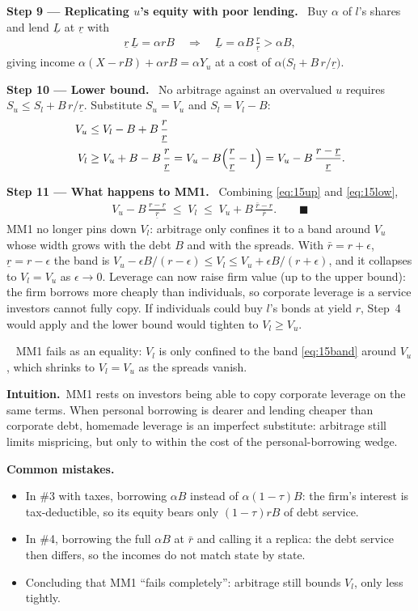 \documentclass[11pt,a4paper]{article}
\numberwithin{equation}{section}
\newcommand{\step}[2]{\par\smallskip\noindent\textbf{Step #1 --- #2.}~}
\newcommand{\intuition}{\par\smallskip\noindent\textbf{Intuition.}~}
\newcommand{\answer}[1]{\par\smallskip\noindent\fbox{\textbf{Answer #1.}}~}
\newcommand{\pitfalls}{\par\medskip\noindent\textbf{Common mistakes.}}
\begin{document}
\step{9}{Replicating $u$'s equity with poor lending} Buy $\alpha$ of $l$'s shares and lend $\underline L$ at $\underline r$ with
\begin{align}
  \underline r\,\underline L = \alpha rB \quad\Longrightarrow\quad \underline L = \alpha B\,\frac{r}{\underline r}>\alpha B, \label{eq:15Llow}
\end{align}
giving income $\alpha(X-rB)+\alpha rB=\alpha Y_u$ at a cost of $\alpha\bigl(S_l+B\,r/\underline r\bigr)$.

\step{10}{Lower bound} No arbitrage against an overvalued $u$ requires $S_u\le S_l+B\,r/\underline r$.
Substitute $S_u=V_u$ and $S_l=V_l-B$:
\begin{align}
  V_u &\le V_l-B+B\,\frac{r}{\underline r} \nonumber\\
  V_l &\ge V_u+B-B\,\frac{r}{\underline r} = V_u - B\Bigl(\frac{r}{\underline r}-1\Bigr) = V_u - B\,\frac{r-\underline r}{\underline r}. \label{eq:15low}
\end{align}

\step{11}{What happens to MM1} Combining \eqref{eq:15up} and \eqref{eq:15low},
\begin{align}
  V_u - B\,\frac{r-\underline r}{\underline r} \;\le\; V_l \;\le\; V_u + B\,\frac{\bar r-r}{\bar r}. \qquad\blacksquare \label{eq:15band}
\end{align}
MM1 no longer pins down $V_l$: arbitrage only confines it to a band around $V_u$ whose width grows
with the debt $B$ and with the spreads. With $\bar r=r+\epsilon$, $\underline r=r-\epsilon$ the band is
$V_u-\epsilon B/(r-\epsilon)\le V_l\le V_u+\epsilon B/(r+\epsilon)$, and it collapses to $V_l=V_u$
as $\epsilon\to0$. Leverage can now raise firm value (up to the upper bound): the firm borrows
more cheaply than individuals, so corporate leverage is a service investors cannot fully copy.
If individuals could buy $l$'s bonds at yield $r$, Step~4 would apply and the lower bound would
tighten to $V_l\ge V_u$.
\answer{(\#4)} MM1 fails as an equality: $V_l$ is only confined to the band \eqref{eq:15band}
around $V_u$, which shrinks to $V_l=V_u$ as the spreads vanish.

\intuition MM1 rests on investors being able to copy corporate leverage on the same terms. When
personal borrowing is dearer and lending cheaper than corporate debt, homemade leverage is an
imperfect substitute: arbitrage still limits mispricing, but only to within the cost of the
personal-borrowing wedge.

\pitfalls
\begin{itemize}
  \item In \#3 with taxes, borrowing $\alpha B$ instead of $\alpha(1-\tau)B$: the firm's interest is
        tax-deductible, so its equity bears only $(1-\tau)rB$ of debt service.
  \item In \#4, borrowing the full $\alpha B$ at $\bar r$ and calling it a replica: the debt
        service then differs, so the incomes do not match state by state.
  \item Concluding that MM1 ``fails completely'': arbitrage still bounds $V_l$, only less tightly.
\end{itemize}
\end{document}
